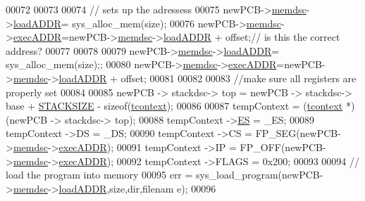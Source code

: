 \begin{DoxyCode}
00072 
00073 
00074                 \textcolor{comment}{// sets up the adressess}
00075                 newPCB->\hyperlink{structprocess_a163551ab7b60184b48e5d440fcd5c2b8}{memdsc}->\hyperlink{structmem_a8f5a4db03ee0560e6bd4dd602ad753c0}{loadADDR}= sys\_alloc\_mem(size);
00076                 newPCB->\hyperlink{structprocess_a163551ab7b60184b48e5d440fcd5c2b8}{memdsc}->\hyperlink{structmem_a5340491e17307817e6dca3b1d260d18a}{execADDR}=newPCB->\hyperlink{structprocess_a163551ab7b60184b48e5d440fcd5c2b8}{memdsc}->\hyperlink{structmem_a8f5a4db03ee0560e6bd4dd602ad753c0}{loadADDR} + offset;\textcolor{comment}{// is 
      this the correct address? }
00077 
00078                 
00079                 newPCB->\hyperlink{structprocess_a163551ab7b60184b48e5d440fcd5c2b8}{memdsc}->\hyperlink{structmem_a8f5a4db03ee0560e6bd4dd602ad753c0}{loadADDR}= sys\_alloc\_mem(size);;
00080                 newPCB->\hyperlink{structprocess_a163551ab7b60184b48e5d440fcd5c2b8}{memdsc}->\hyperlink{structmem_a5340491e17307817e6dca3b1d260d18a}{execADDR}=newPCB->\hyperlink{structprocess_a163551ab7b60184b48e5d440fcd5c2b8}{memdsc}->\hyperlink{structmem_a8f5a4db03ee0560e6bd4dd602ad753c0}{loadADDR} + offset;
00081 
00082                 
00083                 \textcolor{comment}{//make sure all registers are properly set}
00084                 
00085                 newPCB -> stackdsc-> top = newPCB -> stackdsc-> base + \hyperlink{mpx__r2_8h_a21d9543c516fffee84a7963224271f95}{STACKSIZE} 
      - \textcolor{keyword}{sizeof}(\hyperlink{structcontext}{tcontext});
00086                 
00087                 tempContext = (\hyperlink{structcontext}{tcontext} *) (newPCB -> stackdsc-> top);
00088                 tempContext ->\hyperlink{structcontext_a81a78fef7bda3a5dd852b28a905890ab}{ES} = \_ES;
00089                 tempContext ->DS = \_DS;
00090                 tempContext ->CS = FP\_SEG(newPCB->\hyperlink{structprocess_a163551ab7b60184b48e5d440fcd5c2b8}{memdsc}->\hyperlink{structmem_a5340491e17307817e6dca3b1d260d18a}{execADDR});
00091                 tempContext ->IP = FP\_OFF(newPCB->\hyperlink{structprocess_a163551ab7b60184b48e5d440fcd5c2b8}{memdsc}->\hyperlink{structmem_a5340491e17307817e6dca3b1d260d18a}{execADDR});
00092                 tempContext ->FLAGS = 0x200;
00093                 
00094                 \textcolor{comment}{// load the program into memory}
00095                  err = sys\_load\_program(newPCB->\hyperlink{structprocess_a163551ab7b60184b48e5d440fcd5c2b8}{memdsc}->\hyperlink{structmem_a8f5a4db03ee0560e6bd4dd602ad753c0}{loadADDR},size,dir,filenam
      e);
00096                 

\end{DoxyCode}
